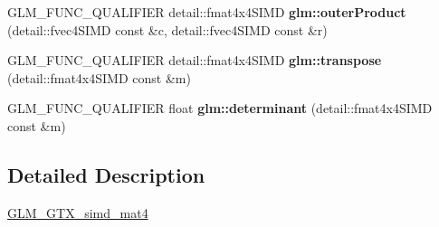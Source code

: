 \begin{DoxyCompactItemize}
\item 
\mbox{\label{simd__mat4_8inl_a24beb25b08989724431540bb9279937c}} 
G\+L\+M\+\_\+\+F\+U\+N\+C\+\_\+\+Q\+U\+A\+L\+I\+F\+I\+ER detail\+::fmat4x4\+S\+I\+MD {\bfseries glm\+::outer\+Product} (detail\+::fvec4\+S\+I\+MD const \&c, detail\+::fvec4\+S\+I\+MD const \&r)
\item 
\mbox{\label{simd__mat4_8inl_a8a85a6f79193f0789bd2ed17802b70f6}} 
G\+L\+M\+\_\+\+F\+U\+N\+C\+\_\+\+Q\+U\+A\+L\+I\+F\+I\+ER detail\+::fmat4x4\+S\+I\+MD {\bfseries glm\+::transpose} (detail\+::fmat4x4\+S\+I\+MD const \&m)
\item 
\mbox{\label{simd__mat4_8inl_a3d33b661dfd45c27b41440cd02605c05}} 
G\+L\+M\+\_\+\+F\+U\+N\+C\+\_\+\+Q\+U\+A\+L\+I\+F\+I\+ER float {\bfseries glm\+::determinant} (detail\+::fmat4x4\+S\+I\+MD const \&m)
\end{DoxyCompactItemize}


\subsection{Detailed Description}
\hyperlink{group__gtx__simd__mat4}{G\+L\+M\+\_\+\+G\+T\+X\+\_\+simd\+\_\+mat4} 